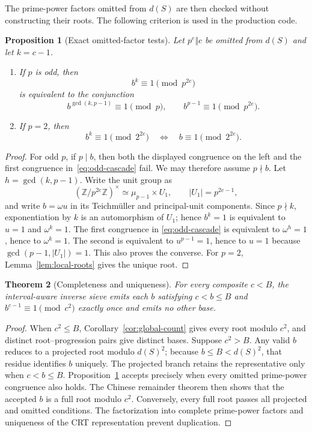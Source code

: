 \documentclass[11pt]{article}
\newtheorem{theorem}{Theorem}
\newtheorem{proposition}[theorem]{Proposition}
\newcommand{\Z}{\mathbb{Z}}
\begin{document}
The prime-power factors omitted from $d(S)$ are then checked without constructing
their roots.  The following criterion is used in the production code.

\begin{proposition}[Exact omitted-factor tests]\label{prop:omitted}
Let $p^e\Vert c$ be omitted from $d(S)$ and let $k=c-1$.

\begin{enumerate}
\item If $p$ is odd, then
\[
 b^k\equiv1\pmod{p^{2e}}
\]
is equivalent to the conjunction
\begin{equation}\label{eq:odd-cascade}
 b^{\gcd(k,p-1)}\equiv1\pmod p,
 \qquad b^{p-1}\equiv1\pmod{p^{2e}}.
\end{equation}
\item If $p=2$, then
\[
 b^k\equiv1\pmod{2^{2e}}
 \quad\Longleftrightarrow\quad
 b\equiv1\pmod{2^{2e}}.
\]
\end{enumerate}
\end{proposition}

\begin{proof}
For odd $p$, if $p\mid b$, then both the displayed congruence on the left and
the first congruence in~\eqref{eq:odd-cascade} fail.  We may therefore assume
$p\nmid b$.  Let $h=\gcd(k,p-1)$.  Write the unit group as
\[
 (\Z/p^{2e}\Z)^\times\simeq\mu_{p-1}\times U_1,
 \qquad |U_1|=p^{2e-1},
\]
and write $b=\omega u$ in its Teichm\"uller and principal-unit components.
Since $p\nmid k$, exponentiation by $k$ is an automorphism of $U_1$; hence
$b^k=1$ is equivalent to $u=1$ and $\omega^k=1$.  The first congruence in
\eqref{eq:odd-cascade} is equivalent to $\omega^h=1$, hence to
$\omega^k=1$.  The second is equivalent to $u^{p-1}=1$, hence to $u=1$
because $\gcd(p-1,|U_1|)=1$.  This also proves the converse.  For $p=2$,
Lemma~\ref{lem:local-roots} gives the unique root.
\end{proof}

\begin{theorem}[Completeness and uniqueness]\label{thm:sieve}
For every composite $c<B$, the interval-aware inverse sieve emits each $b$
satisfying $c<b\leq B$ and $b^{c-1}\equiv1\pmod{c^2}$ exactly once and emits
no other base.
\end{theorem}

\begin{proof}
When $c^2\leq B$, Corollary~\ref{cor:global-count} gives every root modulo
$c^2$, and distinct root--progression pairs give distinct bases.  Suppose
$c^2>B$.  Any valid $b$ reduces to a projected root modulo $d(S)^2$; because
$b\leq B<d(S)^2$, that residue identifies $b$ uniquely.  The projected
branch retains the representative only when $c<b\leq B$.
Proposition~\ref{prop:omitted} accepts precisely when every omitted prime-power
congruence also holds.  The Chinese remainder theorem then shows that the
accepted $b$ is a full root modulo $c^2$.  Conversely, every full root passes
all projected and omitted conditions.  The factorization into complete
prime-power factors and uniqueness of the CRT representation prevent
duplication.
\end{proof}
\end{document}
